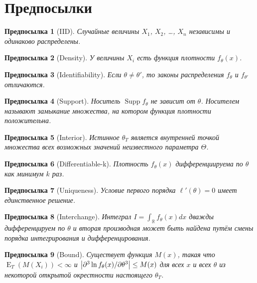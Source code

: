 \documentclass[12pt, a4paper]{article}
\DeclareMathOperator{\E}{E}
\DeclareMathOperator{\Supp}{Supp}
\newcommand{\RR}{\mathbb{R}}
\newtheorem{assumption}{Предпосылка}
\begin{document}
\section*{Предпосылки}

\begin{assumption}[IID] 
  Случайные величины $X_1$, $X_2$, \ldots, $X_n$ независимы и одинаково распределены.
\end{assumption}
  

\begin{assumption}[Density] 
  У величины $X_i$ есть функция плотности $f_{\theta}(x)$.
\end{assumption}

\begin{assumption}[Identifiability] 
  Если $\theta \neq \theta'$, то законы распределения $f_\theta$ и $f_{\theta'}$ отличаются.
\end{assumption}


\begin{assumption}[Support] 
  Носитель $\Supp f_\theta$ не зависит от $\theta$. 
  Носителем называют замыкание множества, на котором функция плотности положительна.
\end{assumption}


\begin{assumption}[Interior] 
  Истинное $\theta_T$ является внутренней точкой множества всех возможных значений неизвестного параметра $\Theta$.
\end{assumption}

\begin{assumption}[Differentiable-k] 
  Плотность $f_\theta(x)$ дифференциируема по $\theta$ как минимум $k$ раз.
\end{assumption}

\begin{assumption}[Uniqueness] 
  Условие первого порядка $\ell'(\theta)=0$ имеет единственное решение. 
\end{assumption}

\begin{assumption}[Interchange] 
  Интеграл $I = \int_{\RR} f_\theta (x) dx$ дважды дифференцируем по $\theta$ и 
  вторая производная может быть найдена путём смены порядка интегрирования и дифференцирования.
\end{assumption}

\begin{assumption}[Bound] 
  Существует функция $M(x)$, такая что 
  $\E_T(M(X_i)) < \infty$ и $\abs{\partial^3 \ln f_\theta(x)/\partial \theta^3} \leq M(x)$ для всех $x$ 
  и всех $\theta$ из некоторой открытой окрестности настоящего $\theta_T$.
\end{assumption}
\end{document}
